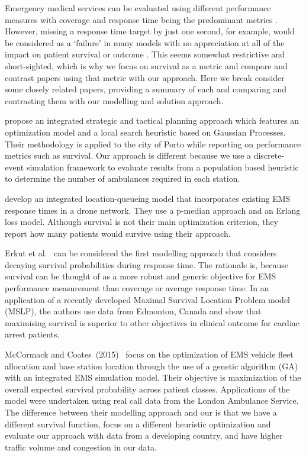 \documentclass[preprint,12pt]{elsarticle}
\begin{document}
Emergency medical services can be evaluated using different performance
measures with coverage and response time being the predominant metrics
\cite{Mclay2010evaluating}. However, missing a response time target by just
one second, for example, would be considered as a `failure' in many models
with no appreciation at all of the impact on patient survival or outcome
\cite{Mclay2010evaluating}. This seems somewhat restrictive and short-sighted,
which is why we focus on survival as a metric and
compare and contrast papers using that metric with our approach.
Here we break consider some closely related papers, providing a
summary of each and comparing and contrasting them with
our modelling and solution approach.

\citet{amorim2019integrated} propose an integrated strategic and tactical
planning approach which features an optimization model and a local search
heuristic based on Gaussian Processes. Their methodology is applied to the
city of Porto while reporting on performance metrics such as survival. Our
approach is different because we use a discrete-event simulation framework
to evaluate results from a population based heuristic to determine the number of
ambulances required in each station. 

\citet{boutilier2022drone} develop an integrated location-queueing model that
incorporates existing EMS response times in a drone network. They use a
p-median approach and an Erlang loss model. Although survival is not their
main optimization criterion,  they report how many patients would survive
using their approach.

Erkut et al.~\cite{Erkut200842} can be considered the first modelling approach
that considers decaying survival probabilities during response time. The
rationale is, because survival can be thought of as a more robust and generic
objective for EMS performance measurement than coverage or average response
time. In an application of a recently developed Maximal Survival Location
Problem model (MSLP), the authors use data from Edmonton, Canada and show that
maximising survival is superior to other objectives in clinical outcome for
cardiac arrest patients.

McCormack and Coates~(2015)~\cite{MCormack2015} focus on the optimization of
EMS vehicle fleet allocation and base station location through the use of a
genetic algorithm (GA) with an integrated EMS simulation model. Their
objective is maximization of the overall expected survival probability across
patient classes. Applications of the model were undertaken using real call
data from the London Ambulance Service. The difference between their modelling
approach and our is that we have a different survival function, focus on a
different heuristic optimization and evaluate our approach with data from a
developing country, and have higher traffic volume and congestion in our data.
\end{document}
